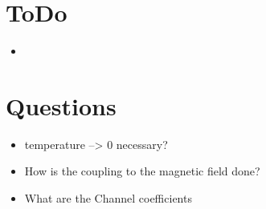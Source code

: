 \section{ToDo}
\begin{itemize}
  \item 
\end{itemize}
\section{Questions}

\begin{itemize}
  \item temperature --> 0 necessary?
  \item How is the coupling to the magnetic field done?
  \item What are the Channel coefficients \cite{PhysRevB.31.6207}
\end{itemize}

\clearpage





